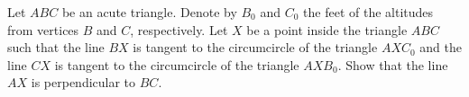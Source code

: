 Let $ABC$ be an acute triangle. Denote by $B_0$ and $C_0$ the feet of the altitudes from vertices $B$ and $C$,  respectively. Let $X$ be a point inside the triangle $ABC$ such that the line $BX$ is tangent to the circumcircle of the triangle $AXC_0$ and the line $CX$ is tangent to the circumcircle of the triangle $AXB_0$. Show that the line $AX$ is perpendicular to $BC$.
